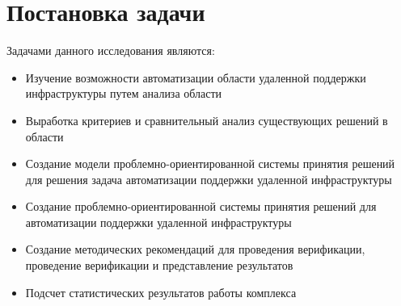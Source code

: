 \section{Постановка задачи} \label{sect1_4}
Задачами данного исследования являются:
\begin{itemize}
	\item Изучение возможности автоматизации области удаленной поддержки инфраструктуры путем анализа области
	\item Выработка критериев и сравнительный анализ существующих решений в области
	\item Создание модели проблемно-ориентированной системы принятия решений для решения задача автоматизации поддержки удаленной инфраструктуры
	\item Создание проблемно-ориентированной системы принятия решений для автоматизации поддержки удаленной инфраструктуры
	\item Создание методических рекомендаций для проведения верификации, проведение верификации и представление результатов 
	\item Подсчет статистических результатов работы комплекса

\end{itemize}



\clearpage
